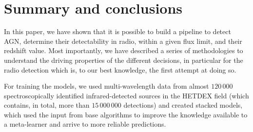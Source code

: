 \documentclass{aa}
\begin{document}




 
\section{Summary and conclusions}\label{sec:summary_conclusions}


In this paper, we have shown that it is possible to build a pipeline to detect AGN, determine their detectability in radio, within a given flux limit, and their redshift value. Most importantly, we have described a series of methodologies to understand the driving properties of the different decisions, in particular for the radio detection which is, to our best knowledge, the first attempt at doing so.

For training the models, we used multi-wavelength data from almost $120\,000$ spectroscopically identified infrared-detected sources in the HETDEX field (which contains, in total, more than $15\,000\,000$ detections) and created stacked models, which used the input from base algorithms to improve the knowledge available to a meta-learner and arrive to more reliable predictions.
\end{document}
